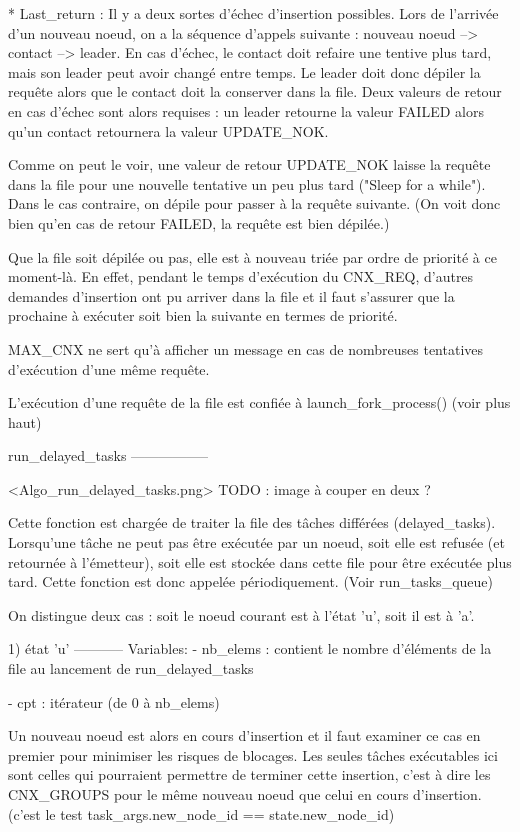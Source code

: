 * Last_return :
Il y a deux sortes d'échec d'insertion possibles.
Lors de l'arrivée d'un nouveau noeud, on a la séquence d'appels suivante : nouveau noeud -->
contact --> leader. En cas d'échec, le contact doit refaire une tentive plus tard, mais son leader
peut avoir changé entre temps. Le leader doit donc dépiler la requête alors que le contact doit la
conserver dans la file. Deux valeurs de retour en cas d'échec sont alors requises : un leader
retourne la valeur FAILED alors qu'un contact retournera la valeur UPDATE_NOK.

Comme on peut le voir, une valeur de retour UPDATE_NOK laisse la requête dans la file pour une
nouvelle tentative un peu plus tard ("Sleep for a while"). Dans le cas contraire, on dépile pour
passer à la requête suivante. (On voit donc bien qu'en cas de retour FAILED, la requête est bien
dépilée.)

Que la file soit dépilée ou pas, elle est à nouveau triée par ordre de priorité à ce moment-là. En
effet, pendant le temps d'exécution du CNX_REQ, d'autres demandes d'insertion ont pu arriver dans la
file et il faut s'assurer que la prochaine à exécuter soit bien la suivante en termes de priorité.

MAX_CNX ne sert qu'à afficher un message en cas de nombreuses tentatives d'exécution d'une même
requête.

L'exécution d'une requête de la file est confiée à launch_fork_process() (voir plus haut)


run_delayed_tasks
-----------------

<Algo_run_delayed_tasks.png> TODO : image à couper en deux ?

Cette fonction est chargée de traiter la file des tâches différées (delayed_tasks). Lorsqu'une tâche
ne peut pas être exécutée par un noeud, soit elle est refusée (et retournée à l'émetteur), soit
elle est stockée dans cette file pour être exécutée plus tard. Cette fonction est donc appelée
périodiquement. (Voir run_tasks_queue)

On distingue deux cas : soit le noeud courant est à l'état 'u', soit il est à 'a'.

1) état 'u'
-----------
Variables:
    - nb_elems : contient le nombre d'éléments de la file au lancement de run_delayed_tasks

    - cpt      : itérateur (de 0 à nb_elems)

Un nouveau noeud est alors en cours d'insertion et il faut examiner ce cas en premier pour minimiser
les risques de blocages.
Les seules tâches exécutables ici sont celles qui pourraient permettre de terminer cette insertion,
c'est à dire les CNX_GROUPS pour le même nouveau noeud que celui en cours d'insertion.
(c'est le test task_args.new_node_id == state.new_node_id)

